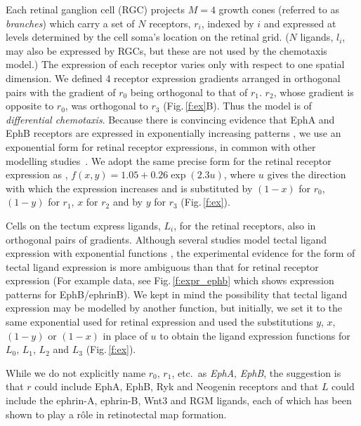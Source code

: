 \documentclass[9pt,lineno]{elife}
\begin{document}
Each retinal ganglion cell (RGC) projects $M=4$ growth cones (referred to as \emph{branches}) which carry a set of $N$ receptors, $r_i$, indexed by $i$ and expressed at levels determined by the cell soma's location on the retinal grid. 
($N$ ligands, $l_i$, may also be expressed by RGCs, but these are not used by the chemotaxis model.) 
The expression of each receptor varies only with respect to one spatial dimension.
%
We defined 4 receptor expression gradients arranged in orthogonal pairs with the gradient of $r_0$ being orthogonal to that of $r_1$. $r_2$, whose gradient is opposite to $r_0$, was orthogonal to $r_3$ (Fig.\,\ref{f:ex}B). Thus the model is of \emph{differential chemotaxis}.
%
Because there is convincing evidence that EphA and EphB receptors are expressed in exponentially increasing patterns \citep{reber_relative_2004,feldheim_genetic_2000,brown_topographic_2000,koulakov_stochastic_2004}, we use an exponential form for retinal receptor expressions, in common with other modelling studies~\citep{reber_relative_2004,koulakov_stochastic_2004,simpson_simple_2011}.
We adopt the same precise form for the retinal receptor expression as \citet{simpson_simple_2011}, $f(x,y) = 1.05 + 0.26 \exp(2.3 u)$, where $u$ gives the direction with which the expression increases and is substituted by $(1-x)$ for $r_0$, $(1-y)$ for $r_1$, $x$ for $r_2$ and by $y$ for $r_3$ (Fig.\,\ref{f:ex}).

Cells on the tectum express ligands, $L_i$, for the retinal receptors, also in orthogonal pairs of gradients.
Although several studies model tectal ligand expression with exponential functions \citep{koulakov_stochastic_2004}, the experimental evidence for the form of tectal ligand expression is more ambiguous than that for retinal receptor expression (For example data, see Fig.\,\ref{f:expr_ephb} which shows expression patterns for EphB/ephrinB). 
We kept in mind the possibility that tectal ligand expression may be modelled by another function, but initially, we set it to the same exponential used for retinal expression and used the substitutions $y$, $x$, $(1-y)$ or $(1-x)$ in place of $u$ to obtain the ligand expression functions for $L_0$, $L_1$, $L_2$ and $L_3$ (Fig.\,\ref{f:ex}).

While we do not explicitly name $r_0$, $r_1$, etc.~as \emph{EphA}, \emph{EphB}, the suggestion is that $r$ could include EphA, EphB, Ryk \citep{schmitt_wntryk_2006} and Neogenin \citep{rajagopalan_neogenin_2004} receptors and that $L$ could include the ephrin-A, ephrin-B, Wnt3 \citep{schmitt_wntryk_2006} and RGM \citep{monnier_rgm_2002} ligands, each of which has been shown to play a r\^ole in retinotectal map formation.
\end{document}
